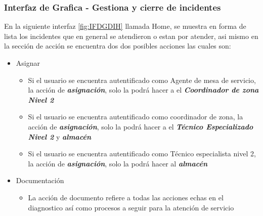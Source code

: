 \subsubsection{Interfaz de Grafica - Gestiona y cierre de incidentes}
En la siguiente interfaz \ref{fig:IFDGDIH} llamada Home, se muestra en forma de lista los incidentes que en general se atendieron o estan por atender, asi mismo en la sección de acción se encuentra dos dos posibles acciones las cuales son:
\begin{itemize}
	\item Asignar 
	\begin{itemize}
		\item Si el usuario se encuentra autentificado como Agente de mesa de servicio, la acción de \textit{\textbf{asignación}}, solo la podrá hacer a el \textbf{\textit{Coordinador de zona Nivel 2}}
		\item Si el usuario se encuentra autentificado como coordinador de zona, la acción de \textit{\textbf{asignación}}, solo la podrá hacer a el \textbf{\textit{Técnico Especializado Nivel 2}} y \textbf{\textit{almacén}}
		
		\item Si el usuario se encuentra autentificado como Técnico especialista nivel 2, la acción de \textit{\textbf{asignación}}, solo la podrá hacer al \textbf{\textit{almacén}}
		
	
		
	\end{itemize}
\item Documentación
\begin{itemize}
		\item La acción  de documento refiere a todas las acciones echas en el diagnostico así como procesos a seguir para la atención de servicio
\end{itemize} 
\end{itemize}

